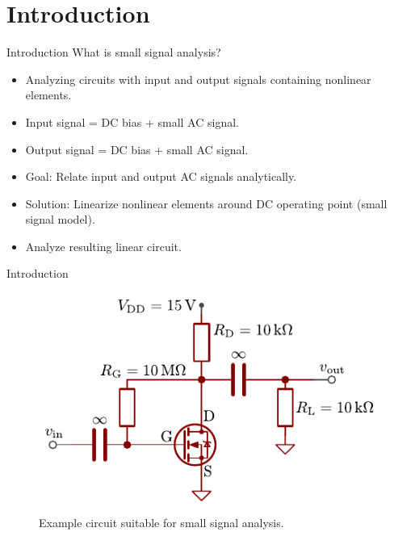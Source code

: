 \section{Introduction}
\begin{frame}{Introduction}
	What is small signal analysis?
	\begin{itemize}
		\item Analyzing circuits with input and output signals containing nonlinear elements.
		\item Input signal = DC bias + small AC signal.
		\item Output signal = DC bias + small AC signal.
		\item Goal: Relate input and output AC signals analytically. 
		\item Solution: Linearize nonlinear elements around DC operating point (small signal model).
		\item Analyze resulting linear circuit.
	\end{itemize}
\end{frame}

\begin{frame}{Introduction}
	\begin{figure}
		\centering
		\includegraphics{../assets/example_circuit.pdf}
		\caption{Example circuit suitable for small signal analysis.}
		\label{fig:example_circuit}
	\end{figure}
\end{frame}